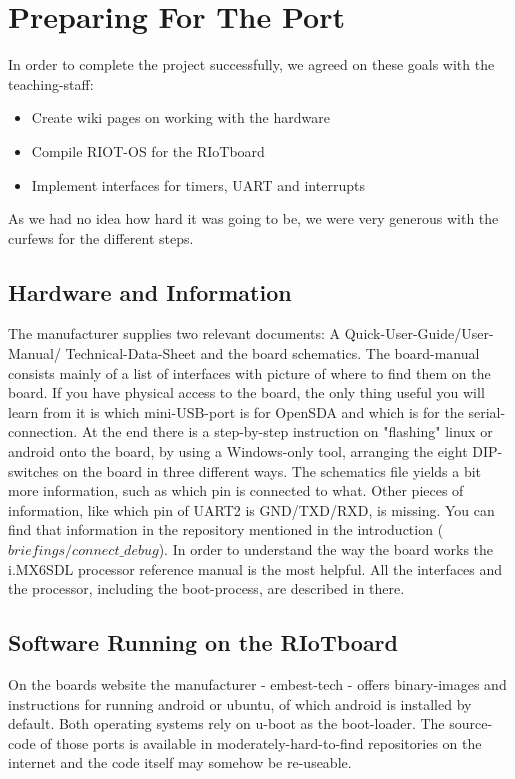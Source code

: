 \section{Preparing For The Port}

In order to complete the project successfully, we agreed on these goals with the
teaching-staff:

\begin{itemize}
\item Create wiki pages on working with the hardware
\item Compile RIOT-OS for the RIoTboard
\item Implement interfaces for timers, UART and interrupts
\end{itemize}

As we had no idea how hard it was going to be, we were very generous with the 
curfews
for the different steps.

\subsection{Hardware and Information}

The manufacturer supplies two relevant documents: A 
Quick-User-Guide/User-Manual/
Technical-Data-Sheet and the board schematics.
The board-manual consists mainly of a list of interfaces with picture of where 
to find them on the board. If you have physical access to the board, the only 
thing useful you will learn from it is which mini-USB-port is for OpenSDA 
and which is for the serial-connection.
At the end there is a step-by-step instruction on "flashing" linux or android 
onto the board, by using a Windows-only tool, arranging the eight DIP-switches 
on the board in three different ways.
The schematics file yields a bit more information, such as which pin is 
connected to what.
Other pieces of information, like which pin of UART2 is GND/TXD/RXD, is missing.
You can find that information in the repository mentioned in the introduction
(\textit{$briefings/connect\_debug$}).
In order to understand the way the board works the i.MX6SDL processor reference 
manual is the most helpful. All the interfaces and the processor, including the 
boot-process, are described in there.

\subsection{Software Running on the RIoTboard}
On the boards website the manufacturer - embest-tech - offers binary-images and
instructions for running android or ubuntu, of which android is installed by 
default.
Both operating systems rely on u-boot as the boot-loader. The source-code of 
those ports is available in moderately-hard-to-find repositories 
\cite{git-uboot} on the internet and the code itself may somehow be re-useable.


